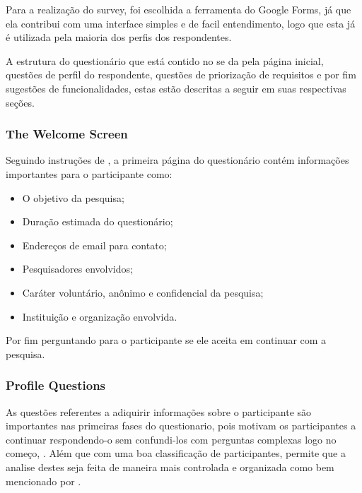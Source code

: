 Para a realização do survey, foi escolhida a ferramenta do Google Forms, já que ela contribui com uma interface simples e de facil entendimento, logo que esta já é utilizada pela maioria dos perfis dos respondentes.

A estrutura do questionário que está contido no  se da pela página inicial, questões de perfil do respondente, questões de priorização de requisitos e por fim sugestões de funcionalidades, estas estão descritas a seguir em suas respectivas seções.
\subsubsection{The Welcome Screen}
Seguindo instruções de , a primeira página do questionário contém informações importantes para o participante como:


\begin{itemize}
  \item O objetivo da pesquisa;
  \item Duração estimada do questionário;
  \item Endereços de email para contato;
  \item Pesquisadores envolvidos;
  \item Caráter voluntário, anônimo e confidencial da pesquisa;
  \item Instituição e organização envolvida.
\end{itemize} 
Por fim perguntando para o participante se ele aceita em continuar com a pesquisa.


\subsubsection{Profile Questions}\label{survey:profile-questions}
As questões referentes a adiquirir informações sobre o participante são importantes nas primeiras fases do questionario, pois motivam os participantes a continuar respondendo-o sem confundi-los com perguntas complexas logo no começo, \cite{LMRea}. Além que com uma boa classificação de participantes, permite que a analise destes seja feita de maneira mais controlada e organizada como bem mencionado por .


